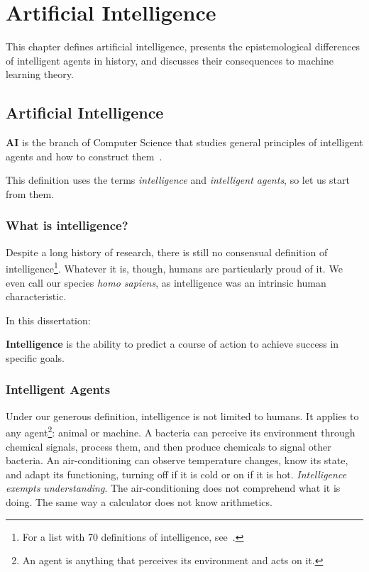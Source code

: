 \chapter{Artificial Intelligence}\label{ch:artificial_intelligence}


This chapter defines artificial intelligence, presents the epistemological differences of intelligent agents in history, and discusses their consequences to machine learning theory.


\section{Artificial Intelligence}
\begin{definition}
	\textbf{AI} is the branch of Computer Science that studies general principles of intelligent agents and how to construct them~\cite{russell:2010}.
\end{definition}
This definition uses the terms \emph{intelligence} and \emph{intelligent agents}, so let us start from them.

\subsection{What is intelligence?} Despite a long history of research, there is still no consensual definition of intelligence\footnote{For a list with 70 definitions of intelligence, see~.}. Whatever it is, though, humans are particularly proud of it. We even call our species \emph{homo sapiens}, as intelligence was an intrinsic human characteristic.

In this dissertation:
\begin{definition}
	\textbf{Intelligence} is the ability to predict a course of action to achieve success in specific goals.
\end{definition}

\subsection{Intelligent Agents} Under our generous definition, intelligence is not limited to humans. It applies to any agent\footnote{An agent is anything that perceives its environment and acts on it.}: animal or machine. A bacteria can perceive its environment through chemical signals, process them, and then produce chemicals to signal other bacteria. An air-conditioning can observe temperature changes, know its state, and adapt its functioning, turning off if it is cold or on if it is hot. \emph{Intelligence exempts understanding}. The air-conditioning does not comprehend what it is doing. The same way a calculator does not know arithmetics.


